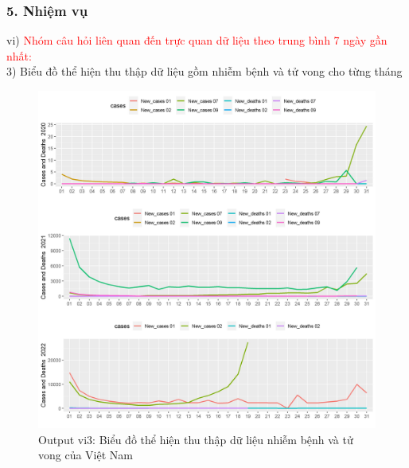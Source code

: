 \documentclass[english,10pt,table]{beamer}
\begin{document}
\begin{frame}[fragile]
\frametitle{5.  Nhiệm vụ}
vi) \textcolor{red}{Nhóm câu hỏi liên quan đến trực quan dữ liệu theo trung bình 7 ngày gần nhất:}\\
    3) Biểu đồ thể hiện thu thập dữ liệu gồm nhiễm bệnh và tử vong cho từng tháng
	\begin{figure}[h!]
	\begin{center}
		    \includegraphics[scale = 0.26]{Images/VI/vi3 Vietnam .jpeg}
		     \caption{Output vi3: Biểu đồ thể hiện thu thập dữ liệu nhiễm bệnh và tử vong của Việt Nam}
		\end{center}
		\end{figure}
\end{frame}
\end{document}
